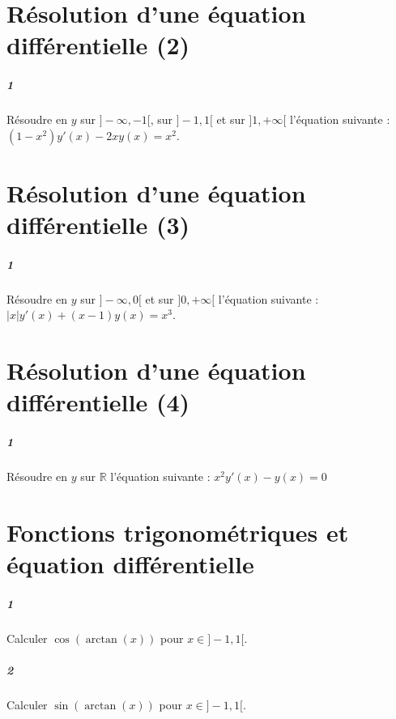 \documentclass[10pt,a4paper]{article}
\begin{document}
\section{Résolution d'une équation différentielle (2)}
\subparagraph{1}Résoudre en $y$ sur $]-\infty,-1[$, sur $]-1,1[$ et sur $]1,+\infty[$ l'équation suivante : $(1-x^2)y'(x)-2xy(x)=x^2$.

\section{Résolution d'une équation différentielle (3)}
\subparagraph{1}Résoudre en $y$ sur $]-\infty,0[$ et sur $]0,+\infty[$ l'équation suivante : $\lvert x \rvert y'(x) +(x-1)y(x)=x^3$.

\section{Résolution d'une équation différentielle (4)}
\subparagraph{1}Résoudre en $y$ sur $\mathbb{R}$ l'équation suivante : $x^2y'(x)-y(x)=0$

\section{Fonctions trigonométriques et équation différentielle}
\subparagraph{1}Calculer $\cos(\arctan(x))$ pour $x \in]-1,1[$.
\subparagraph{2}Calculer $\sin(\arctan(x))$ pour $x \in]-1,1[$.
\end{document}
